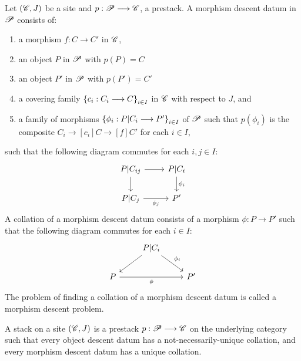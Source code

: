 \documentclass[11pt]{amsart}
\begin{document}
\begin{defn}
Let $(\mathscr{C}, J)$ be a site and $p : \sP \to \sC$, a prestack. A morphism descent datum
in $\mathscr{P}$ consists of:
\begin{enumerate}
\item a morphism $f : C \to C'$ in $\mathscr{C}$,
\item an object $P$ in $\mathscr{P}$ with $p(P) = C$
\item an object $P'$ in $\mathscr{P}$ with $p(P') = C'$
\item a covering family $\set{c_i : C_i \to C}_{i \in I}$ in $\mathscr{C}$ with respect to $J$, and
\item a family of morphisms $\set{\phi_i : P|C_i \to P'}_{i \in I}$ of $\mathscr{P}$ such that
$p(\phi_i)$ is the composite $C_i \to[c_i] C \to[f] C'$ for each $i \in I$,
\end{enumerate}
such that the following diagram commutes for each $i, j \in I$:
\[\begin{tikzcd}
P|C_{ij} \ar[r] \ar[d] & P|C_i \ar[d, "\phi_i"] \\
P|C_j \ar[r, "\phi_j" below] & P'
\end{tikzcd}\]
A collation of a morphism descent datum consists of a morphism $\phi : P \to P'$ such
that the following diagram commutes for each $i \in I$:
\[\begin{tikzcd}
& P|C_i \ar[ld] \ar[rd, "\phi_i"] & \\
P \ar[rr, "\phi" below] & & P'
\end{tikzcd}\]
The problem of finding a collation of a morphism descent datum is called a morphism descent problem.
\end{defn}

\begin{defn}[Stack]\label{defn:st}
A stack on a site $(\mathscr{C}, J)$ is a prestack $p : \sP \to \sC$ on the underlying category such
that every object descent datum has a not-necessarily-unique collation, and
every morphism descent datum has a unique collation.
\end{defn}
\end{document}
